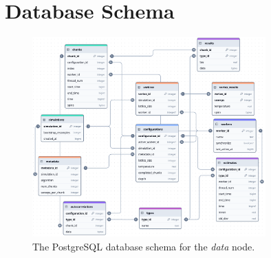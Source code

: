 \chapter{Database Schema}\label{chap:schema}
	\begin{figure}[htbp]
		\centering
		\includegraphics[width=0.8\textwidth]{schema.png}
		\caption[PostgreSQL database schema]{The PostgreSQL database schema for the \emph{data} node.}
		\label{fig:schema}
	\end{figure}